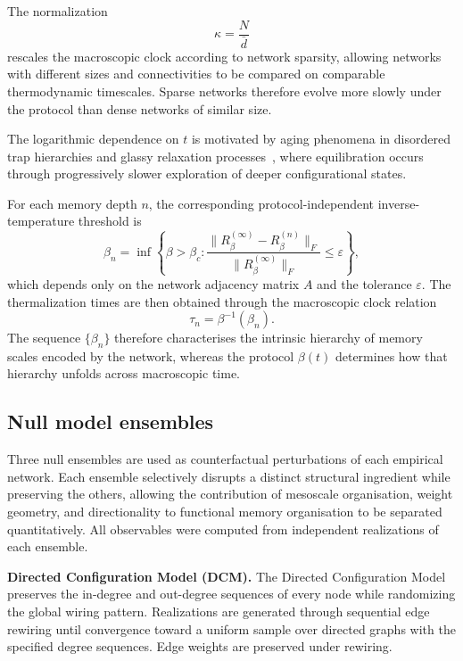 \documentclass[aps,superscriptaddress,11pt]{revtex4-2}
\theoremstyle{definition}
\theoremstyle{plain}
\begin{document}
The normalization
\[
\kappa=\frac{N}{\bar d}
\]
rescales the macroscopic clock according to network sparsity, allowing
networks with different sizes and connectivities to be compared on
comparable thermodynamic timescales. Sparse networks therefore evolve more
slowly under the protocol than dense networks of similar size.

The logarithmic dependence on $t$ is motivated by aging phenomena in
disordered trap hierarchies and glassy relaxation
processes~\cite{Bouchaud1992,Monthus1996}, where equilibration occurs
through progressively slower exploration of deeper configurational states.

For each memory depth $n$, the corresponding protocol-independent
inverse-temperature threshold is
\begin{equation}
  \beta_n
  =
  \inf\!\left\{
    \beta>\beta_c :
    \frac{
      \|R_\beta^{(\infty)}-R_\beta^{(n)}\|_F
    }{
      \|R_\beta^{(\infty)}\|_F
    }
    \le\varepsilon
  \right\},
  \label{eq:beta_thresh_methods}
\end{equation}
which depends only on the network adjacency matrix $A$ and the tolerance
$\varepsilon$. The thermalization times are then obtained through the
macroscopic clock relation
\[
\tau_n=\beta^{-1}(\beta_n).
\]
The sequence $\{\beta_n\}$ therefore characterises the intrinsic hierarchy
of memory scales encoded by the network, whereas the protocol
$\beta(t)$ determines how that hierarchy unfolds across macroscopic time.

\subsection{Null model ensembles}

Three null ensembles are used as counterfactual perturbations of each
empirical network. Each ensemble selectively disrupts a distinct structural
ingredient while preserving the others, allowing the contribution of
mesoscale organisation, weight geometry, and directionality to functional
memory organisation to be separated quantitatively. All observables were
computed from independent realizations of each ensemble.

\medskip
\noindent\textbf{Directed Configuration Model (DCM).}
The Directed Configuration Model preserves the in-degree and out-degree
sequences of every node while randomizing the global wiring pattern.
Realizations are generated through sequential edge rewiring until
convergence toward a uniform sample over directed graphs with the specified
degree sequences. Edge weights are preserved under rewiring.
\end{document}
